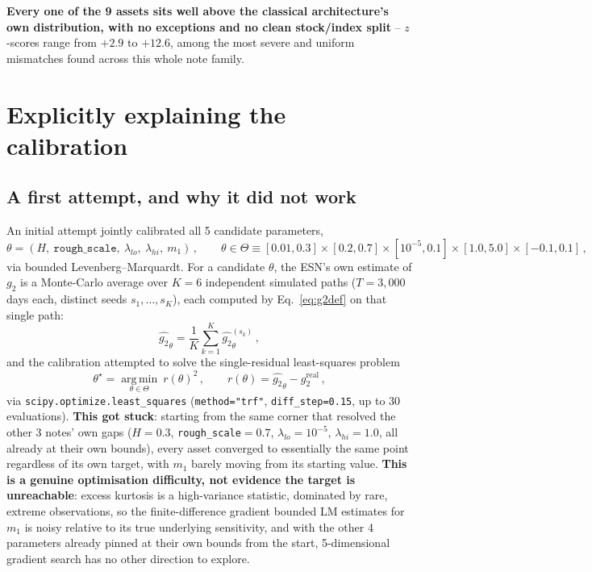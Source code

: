 \documentclass[11pt]{article}
\begin{document}
\textbf{Every one of the 9 assets sits well above the classical
architecture's own distribution, with no exceptions and no clean
stock/index split} -- $z$-scores range from $+2.9$ to $+12.6$, among the
most severe and uniform mismatches found across this whole note family.

\section{Explicitly explaining the calibration}
\label{sec:calibmethod}

\subsection{A first attempt, and why it did not work}
\label{sec:firstattempt}
An initial attempt jointly calibrated all 5 candidate parameters,
\begin{equation}
\theta = (H,\ \texttt{rough\_scale},\ \lambda_{lo},\ \lambda_{hi},\ m_1)\, ,
\qquad
\theta \in \Theta \equiv [0.01,0.3]\times[0.2,0.7]\times[10^{-5},0.1]
\times[1.0,5.0]\times[-0.1,0.1]\, ,
\label{eq:kurttheta}
\end{equation}
via bounded Levenberg--Marquardt. For a candidate $\theta$, the ESN's own
estimate of $g_2$ is a Monte-Carlo average over $K=6$ independent simulated
paths ($T=3{,}000$ days each, distinct seeds $s_1,\dots,s_K$), each computed
by Eq.~\ref{eq:g2def} on that single path:
\begin{equation}
\widehat{g_2}_\theta = \frac{1}{K}\sum_{k=1}^{K}\widehat{g_2}_\theta^{(s_k)}\, ,
\label{eq:kurtmc}
\end{equation}
and the calibration attempted to solve the single-residual least-squares
problem
\begin{equation}
\theta^\star = \operatorname*{arg\,min}_{\theta\in\Theta}\ r(\theta)^2\, ,
\qquad
r(\theta) = \widehat{g_2}_\theta - g_2^{\text{real}}\, ,
\label{eq:kurtres}
\end{equation}
via \texttt{scipy.optimize.least\_squares} (\texttt{method="trf"},
\texttt{diff\_step=0.15}, up to 30 evaluations).
\textbf{This got stuck}: starting from the same
corner that resolved the other 3 notes' own gaps ($H=0.3$,
\texttt{rough\_scale}$=0.7$, $\lambda_{lo}=10^{-5}$, $\lambda_{hi}=1.0$, all
already at their own bounds), every asset converged to essentially the same
point regardless of its own target, with $m_1$ barely moving from its
starting value. \textbf{This is a genuine optimisation difficulty, not
evidence the target is unreachable}: excess kurtosis is a high-variance
statistic, dominated by rare, extreme observations, so the finite-difference
gradient bounded LM estimates for $m_1$ is noisy relative to its true
underlying sensitivity, and with the other 4 parameters already pinned at
their own bounds from the start, 5-dimensional gradient search has no other
direction to explore.
\end{document}
